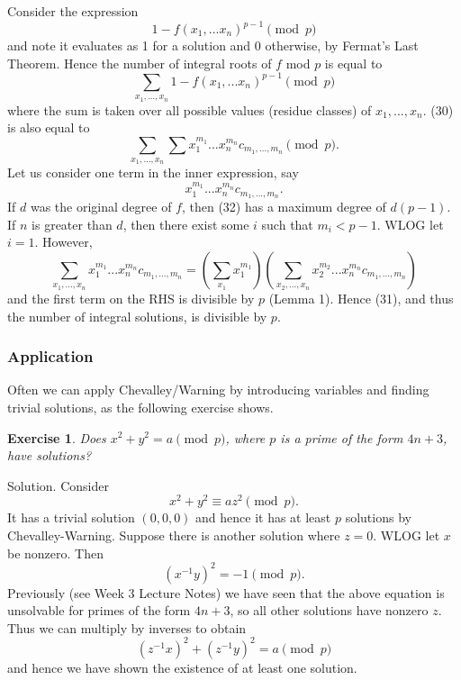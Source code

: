 \documentclass{article}
\newtheorem{exercise}{Exercise}
\begin{document}
\subsubsection{}
Consider the expression
\begin{equation}
    1 - f(x_{1},...x_{n})^{p-1} \pmod{p}
\end{equation}
and note it evaluates as 1 for a solution and 0 otherwise, by Fermat's Last Theorem. Hence the number of integral roots of $f$ mod $p$ is equal to
\begin{equation}
    \sum_{x_{1},...,x_{n}} 1 - f(x_{1},...x_{n})^{p-1} \pmod{p}
\end{equation}
where the sum is taken over all possible values (residue classes) of $x_{1},...,x_{n}$. (30) is also equal to
\begin{equation}
    \sum_{x_{1},...,x_{n}} \sum x_{1}^{m_{1}}...x_{n}^{m_{n}}c_{m_{1},...,m_{n}} \pmod{p}.
\end{equation}
Let us consider one term in the inner expression, say
\begin{equation}
    x_{1}^{m_{1}}...x_{n}^{m_{n}}c_{m_{1},...,m_{n}}.
\end{equation}
If $d$ was the original degree of $f$, then (32) has a maximum degree of $d(p-1)$. If $n$ is greater than $d$, then there exist some $i$ such that $m_{i} < p-1$. WLOG let $i = 1$. However,
\begin{equation}
    \sum_{x_{1},...,x_{n}} x_{1}^{m_{1}}...x_{n}^{m_{n}}c_{m_{1},...,m_{n}} =
    (\sum_{x_{1}}x_{1}^{m_{1}})(\sum_{x_{2},...,x_{n}} x_{2}^{m_{2}}...x_{n}^{m_{n}}c_{m_{1},...,m_{n}})
\end{equation}
and the first term on the RHS is divisible by $p$ (Lemma 1). Hence (31), and thus the number of integral solutions, is divisible by $p$.
\subsubsection{Application}
Often we can apply Chevalley/Warning by introducing variables and finding trivial solutions, as the following exercise shows.
\begin{exercise}
    Does $x^{2} + y^{2} = a \pmod{p}$, where $p$ is a prime of the form $4n+3$, have solutions?
\end{exercise}
Solution. Consider
\begin{equation}
    x^{2} + y^{2} \equiv az^{2} \pmod{p}.
\end{equation}
It has a trivial solution $(0,0,0)$ and hence it has at least $p$ solutions by Chevalley-Warning. Suppose there is another solution where $z = 0$. WLOG let $x$ be nonzero. Then
\begin{equation}
    (x^{-1}y)^{2} = -1 \pmod{p}.
\end{equation}
Previously (see Week 3 Lecture Notes) we have seen that the above equation is unsolvable for primes of the form $4n+3$, so all other solutions have nonzero $z$. Thus we can multiply by inverses to obtain
\begin{equation}
    (z^{-1}x)^{2}+ (z^{-1}y)^{2} = a \pmod{p}
\end{equation}
and hence we have shown the existence of at least one solution.
\end{document}
